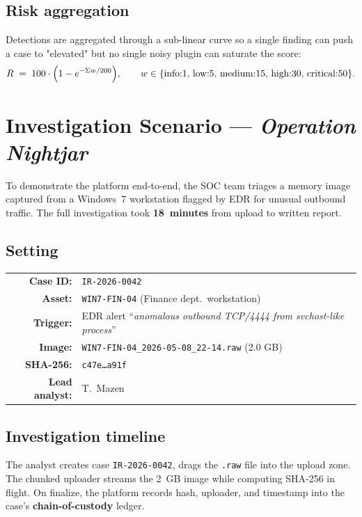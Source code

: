 \documentclass[11pt,a4paper]{article}
\begin{document}
\subsection*{Risk aggregation}
Detections are aggregated through a sub-linear curve so a single finding can
push a case to "elevated" but no single noisy plugin can saturate the score:
$$
R \;=\; 100 \cdot \Bigl(1 - e^{-\Sigma w / 200}\Bigr),
\qquad
w \in \{\text{info:1, low:5, medium:15, high:30, critical:50}\}.
$$

\section{Investigation Scenario — \emph{Operation Nightjar}}

To demonstrate the platform end-to-end, the SOC team triages a memory image
captured from a Windows~7 workstation flagged by EDR for unusual outbound
traffic. The full investigation took \textbf{18~minutes} from upload to
written report.

\subsection{Setting}
\begin{center}
\renewcommand{\arraystretch}{1.2}
\begin{tabular}{rl}
\textbf{Case ID:}      & \texttt{IR-2026-0042} \\
\textbf{Asset:}        & \texttt{WIN7-FIN-04} (Finance dept.\ workstation) \\
\textbf{Trigger:}      & EDR alert ``\textit{anomalous outbound TCP/4444 from svchost-like process}'' \\
\textbf{Image:}        & \texttt{WIN7-FIN-04\_2026-05-08\_22-14.raw} (2.0 GB) \\
\textbf{SHA-256:}      & \texttt{c47e\ldots a91f} \\
\textbf{Lead analyst:} & T.\ Mazen \\
\end{tabular}
\end{center}

\subsection{Investigation timeline}

\begin{stepbox}
The analyst creates case \texttt{IR-2026-0042}, drags the
\texttt{.raw} file into the upload zone. The chunked uploader streams the
2~GB image while computing SHA-256 in flight. On finalize, the platform
records hash, uploader, and timestamp into the case's
\textbf{chain-of-custody} ledger.
\end{stepbox}
\end{document}
